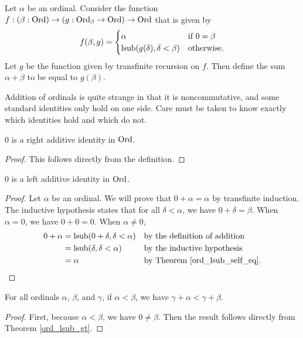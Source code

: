 \documentclass[../../math.tex]{subfiles}
\begin{document}
\begin{instance}
    Let $\alpha$ be an ordinal.  Consider the function $f : (\beta : \operatorname{Ord}) \to
    (g : \operatorname{Ord}_\beta \to \operatorname{Ord}) \to \operatorname{Ord}$ that is given by
    \[
        f(\beta, g) = \begin{cases}
            \alpha &\text{if $0 = \beta$} \\
            \operatorname{lsub}(g(\delta), \delta < \beta) &\text{otherwise.}
        \end{cases}
    \]
    Let $g$ be the function given by transfinite recursion on $f$.  Then define
    the sum $\alpha + \beta$ to be equal to $g(\beta)$.
\end{instance}

Addition of ordinals is quite strange in that it is noncommutative, and some
standard identities only hold on one side.  Care must be taken to know exactly
which identities hold and which do not.

\begin{instance}
    $0$ is a right additive identity in $\operatorname{Ord}$.
\end{instance}
\begin{proof}
    This follows directly from the definition.
\end{proof}

\begin{instance}
    $0$ is a left additive identity in $\operatorname{Ord}$.
\end{instance}
\begin{proof}
    Let $\alpha$ be an ordinal.  We will prove that $0 + \alpha = \alpha$ by
    transfinite induction.  The inductive hypothesis states that for all $\delta
    < \alpha$, we have $0 + \delta = \beta$.  When $\alpha = 0$, we have $0 + 0 =
    0$.  When $\alpha \neq 0$,
    \begin{align*}
        0 + \alpha
        &= \operatorname{lsub}(0 + \delta, \delta < \alpha)
            && \text{by the definition of addition} \\
        &= \operatorname{lsub}(\delta, \delta < \alpha)
            && \text{by the inductive hypothesis} \\
        &= \alpha
            && \text{by Theorem \ref{ord_lsub_self_eq}.} \\
    \end{align*}
\end{proof}

\begin{theorem} \label{ord_lt_lplus}
    For all ordinals $\alpha$, $\beta$, and $\gamma$, if $\alpha < \beta$, we
    have $\gamma + \alpha < \gamma + \beta$.
\end{theorem}
\begin{proof}
    First, because $\alpha < \beta$, we have $0 \neq \beta$.  Then the result
    follows directly from Theorem \ref{ord_lsub_gt}.
\end{proof}
\end{document}
